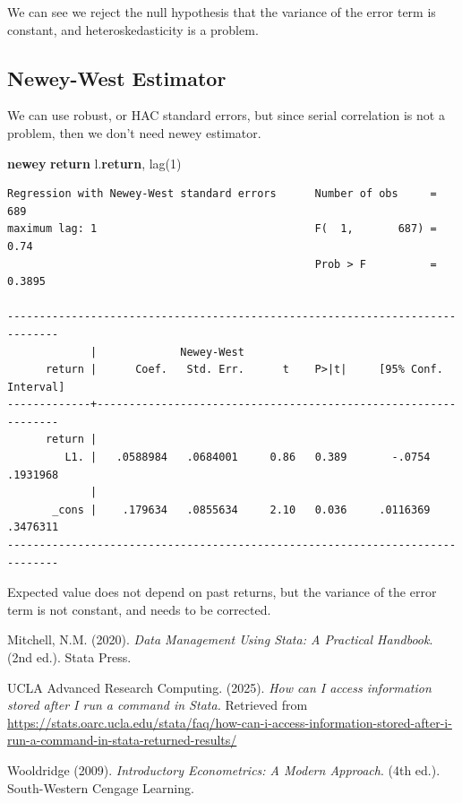\documentclass[
]{book}
\newenvironment{Shaded}{\begin{snugshade}}{\end{snugshade}}
\newcommand{\FunctionTok}[1]{\textcolor[rgb]{0.13,0.29,0.53}{\textbf{#1}}}
\newcommand{\KeywordTok}[1]{\textcolor[rgb]{0.13,0.29,0.53}{\textbf{#1}}}
\newcommand{\NormalTok}[1]{#1}
\newcommand{\OtherTok}[1]{\textcolor[rgb]{0.56,0.35,0.01}{#1}}
\begin{document}
We can see we reject the null hypothesis that the variance of the error term
is constant, and heteroskedasticity is a problem.

\subsection*{Newey-West Estimator}\label{newey-west-estimator}

We can use robust, or HAC standard errors, but since serial correlation is
not a problem, then we don't need newey estimator.

\begin{Shaded}
\begin{Highlighting}[]
\KeywordTok{newey} \FunctionTok{return} \OtherTok{l}\NormalTok{.}\FunctionTok{return}\NormalTok{, lag(1)}
\end{Highlighting}
\end{Shaded}

\begin{verbatim}
Regression with Newey-West standard errors      Number of obs     =        689
maximum lag: 1                                  F(  1,       687) =       0.74
                                                Prob > F          =     0.3895

------------------------------------------------------------------------------
             |             Newey-West
      return |      Coef.   Std. Err.      t    P>|t|     [95% Conf. Interval]
-------------+----------------------------------------------------------------
      return |
         L1. |   .0588984   .0684001     0.86   0.389       -.0754    .1931968
             |
       _cons |    .179634   .0855634     2.10   0.036     .0116369    .3476311
------------------------------------------------------------------------------
\end{verbatim}

Expected value does not depend on past returns, but the variance of the error
term is not constant, and needs to be corrected.

Mitchell, N.M. (2020). \emph{Data Management Using Stata: A Practical Handbook}. (2nd ed.). Stata Press.

UCLA Advanced Research Computing. (2025). \emph{How can I access information stored after I run a command in Stata.} Retrieved from \url{https://stats.oarc.ucla.edu/stata/faq/how-can-i-access-information-stored-after-i-run-a-command-in-stata-returned-results/}

Wooldridge (2009). \emph{Introductory Econometrics: A Modern Approach}. (4th ed.). South-Western Cengage Learning.


\end{document}

